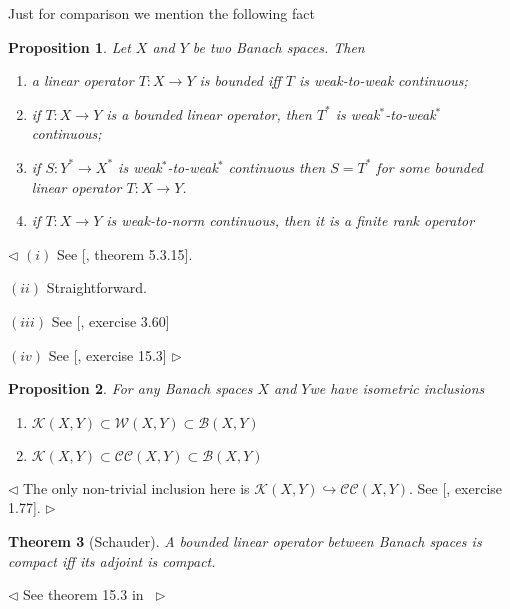 \documentclass[12pt]{article}
\newtheorem{theorem}{Theorem}[section]
\newtheorem{proposition}[theorem]{Proposition}
\newenvironment{proof}{\par $\triangleleft$}{$\triangleright$}
\begin{document}
Just for comparison we mention the following fact

\begin{proposition} Let $X$ and $Y$ be two Banach spaces. Then

    \begin{enumerate}[label = (\roman*)]
        \item a linear operator $T:X\to Y$ is bounded iff $T$ is weak-to-weak
              continuous;

        \item if $T:X\to Y$ is a bounded linear operator, then $T^*$ is
              weak${}^*$-to-weak${}^*$ continuous;

        \item if $S:Y^*\to X^*$ is weak${}^*$-to-weak${}^*$ continuous then
              $S=T^*$ for some bounded linear operator $T:X\to Y$.

        \item if $T:X\to Y$ is weak-to-norm continuous, then it is a finite rank
              operator
    \end{enumerate}
\end{proposition}
\begin{proof} $(i)$ See [\cite{DunfSchwLinOpsVol1}, theorem 5.3.15].

    $(ii)$ Straightforward.

    $(iii)$ See [\cite{FabHabBanSpTh}, exercise 3.60]

    $(iv)$ See [\cite{FabHabBanSpTh}, exercise 15.3]  %
\end{proof}

\begin{proposition} For any Banach spaces $X$ and $Y$we have isometric
    inclusions
    \begin{enumerate}[label = (\roman*)]
        \item $\mathcal{K}(X,Y)\subset\mathcal{W}(X,Y)\subset\mathcal{B}(X,Y)$
        \item $\mathcal{K}(X,Y)\subset\mathcal{CC}(X,Y)\subset\mathcal{B}(X,Y)$
    \end{enumerate}
\end{proposition}
\begin{proof} The only non-trivial inclusion here is
    $\mathcal{K}(X,Y)\hookrightarrow \mathcal{CC}(X,Y)$. See
        [\cite{FabHabBanSpTh}, exercise 1.77].
\end{proof}

\begin{theorem}[Schauder] A bounded linear operator between Banach spaces is
    compact iff its adjoint is compact.
\end{theorem}
\begin{proof} See theorem 15.3 in~\cite{FabHabBanSpTh}
\end{proof}
\end{document}
